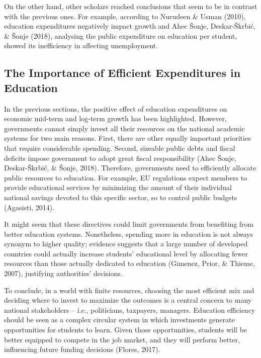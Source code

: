 \documentclass[
]{article}
\begin{document}
On the other hand, other scholars reached conclusions that seem to be in
contrast with the previous ones. For example, according to Nurudeen \&
Usman (2010), education expenditures negatively impact growth and Ahec
Šonje, Deskar-Škrbić, \& Šonje (2018), analysing the public expenditure
on education per student, showed its inefficiency in affecting
unemployment.

\hypertarget{the-importance-of-efficient-expenditures-in-education}{%
\subsection{The Importance of Efficient Expenditures in
Education}\label{the-importance-of-efficient-expenditures-in-education}}

In the previous sections, the positive effect of education expenditures
on economic mid-term and log-term growth has been highlighted. However,
governments cannot simply invest all their resources on the national
academic systems for two main reasons. First, there are other equally
important priorities that require considerable spending. Second,
sizeable public debts and fiscal deficits impose government to adopt
great fiscal responsibility (Ahec Šonje, Deskar-Škrbić, \& Šonje, 2018).
Therefore, governments need to efficiently allocate public resources to
education. For example, EU regulations expect members to provide
educational services by minimizing the amount of their individual
national savings devoted to this specific sector, so to control public
budgets (Agasisti, 2014).

It might seem that these directives could limit governments from
benefiting from better education systems. Nonetheless, spending more in
education is not always synonym to higher quality; evidence suggests
that a large number of developed countries could actually increase
students' educational level by allocating fewer resources than those
actually dedicated to education (Gimenez, Prior, \& Thieme, 2007),
justifying authorities' decisions.

To conclude, in a world with finite resources, choosing the most
efficient mix and deciding where to invest to maximize the outcomes is a
central concern to many national stakeholders -- i.e., politicians,
taxpayers, managers. Education efficiency should be seen as a complex
circular system in which investments generate opportunities for students
to learn. Given those opportunities, students will be better equipped to
compete in the job market, and they will perform better, influencing
future funding decisions (Flores, 2017).
\end{document}
